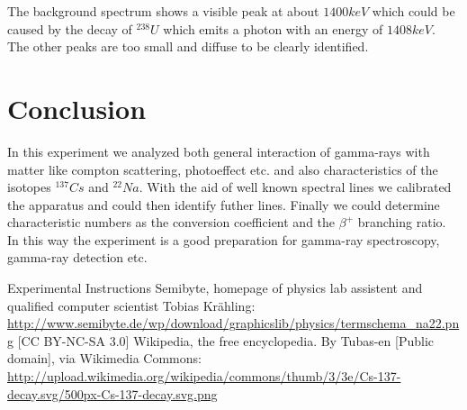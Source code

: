 \documentclass[bigchapter,colorback,accentcolor=tud4b,linedtoc,11pt]{tudreport}
\begin{document}
The background spectrum shows a visible peak at about $1400keV$ which could be
caused by the decay of $^{238}U$ which emits a photon with an energy of
$1408keV$. The other peaks are too small and diffuse to be clearly identified.

\chapter{Conclusion}

In this experiment we analyzed both general interaction of gamma-rays with
matter like compton scattering, photoeffect etc. and also characteristics of the
isotopes $^{137}Cs$ and $^{22}Na$. With the aid of well known spectral lines we
calibrated the apparatus and could then identify futher lines. Finally we could
determine characteristic numbers as the conversion coefficient and the $\beta^+$
branching ratio. In this way the experiment is a good preparation for gamma-ray
spectroscopy, gamma-ray detection etc.

\cleardoublepage{}
\newpage
\begin{thebibliography}{100}
   {Experimental Instructions}  {Semibyte, homepage of physics lab assistent and qualified
      computer scientist Tobias Krähling:
      \url{http://www.semibyte.de/wp/download/graphicslib/physics/termschema_na22.png}
    [CC BY-NC-SA 3.0]}
   {Wikipedia, the free encyclopedia. By Tubas-en [Public
      domain], via Wikimedia Commons: \url{http://upload.wikimedia.org/wikipedia/commons/thumb/3/3e/Cs-137-decay.svg/500px-Cs-137-decay.svg.png}}
\end{thebibliography}
\end{document}
